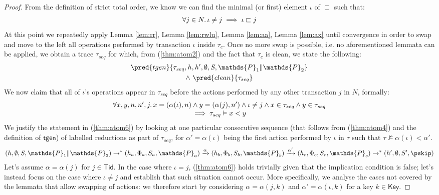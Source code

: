 \begin{thm}
{\begin{proof}
From the definition of strict total order, we know we can find the minimal (or first) element $\iota$ of $\sqsubset$ such that:
\begin{gather}
	\label{thm:atom3} \forall j \in N \ldotp \iota \neq j \implies \iota \sqsubset j
\end{gather}
At this point we repeatedly apply Lemma \ref{lem:rr}, Lemma \ref{lem:rwlu}, Lemma \ref{lem:aa}, Lemma \ref{lem:ax} until convergence in order to swap and move to the left all operations performed by transaction $\iota$ inside $\tau_c$. Once no more swap is possible, i.e. no aforementioned lemmata can be applied, we obtain a trace $\tau_{seq}$ for which, from (\ref{thm:atom2}) and the fact that $\tau_c$ is clean, we state the following:
\begin{gather}
	\label{thm:atom4} \pred{tgen}{\tau_{seq}, h, h', \emptyset, S, \mathds{P}_1 \| \mathds{P}_2} \\
		\land\
	\label{thm:atom7} \pred{clean}{\tau_{seq}}
\end{gather}
We now claim that all of $\iota$'s operations appear in $\tau_{seq}$ before the actions performed by any other transaction $j$ in $N$, formally:
\begin{gather}
	\label{thm:atom6}
	\begin{array}{c}
		\forall x, y, n, n', j \ldotp
	x = (\alpha(\iota), n) \land y = (\alpha(j), n') \land \iota \neq j \land x \in \tau_{seq} \land y \in \tau_{seq} \\
	\implies \tau_{seq} \vDash x < y
	\end{array}
\end{gather}
We justify the statement in (\ref{thm:atom6}) by looking at one particular consecutive sequence (that follows from (\ref{thm:atom4}) and the definition of $\mathsf{tgen}$) of labelled reductions as part of $\tau_{seq}$, for $\alpha' = \alpha(\iota)$ being the first action performed by $\iota$ in $\tau$ such that $\tau \not\vDash \alpha(\iota) < \alpha'$.
\begin{gather*}
	(h, \emptyset, S, \mathds{P}_1 \| \mathds{P}_2)
		\rightarrow^*
	(h_a, \Phi_a, S_a, \mathds{P}_a)
		\xrightarrow{\alpha}
	(h_b, \Phi_b, S_b, \mathds{P}_b)
		\xrightarrow{\alpha'}
	(h_c, \Phi_c, S_c, \mathds{P}_c)
		\rightarrow^*
	(h', \emptyset, S', \pskip)
\end{gather*}
Let's assume $\alpha = \alpha(j)$ for $j \in \mathsf{Tid}$. In the case where $\iota = j$, (\ref{thm:atom6}) holds trivially given that the implication condition is false; let's instead focus on the case where $\iota \neq j$ and establish that such situation cannot occur. More specifically, we analyse the cases not covered by the lemmata that allow swapping of actions: we therefore start by considering $\alpha = \alpha(j, k)$ and $\alpha' = \alpha(\iota, k)$ for a key $k \in \mathsf{Key}$.

\end{proof}}
\end{thm}
